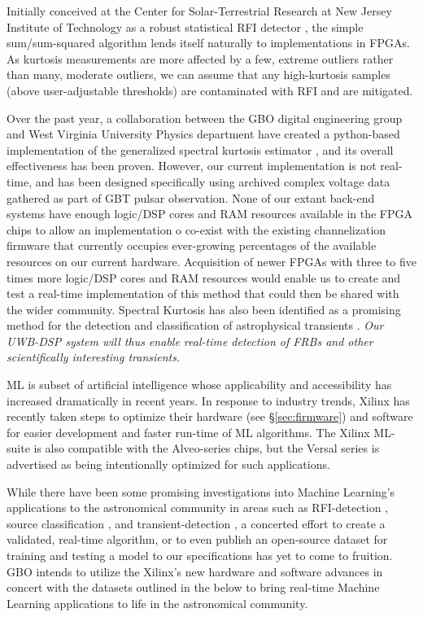 \documentclass[10pt]{myNSF}
\begin{document}
 Initially conceived at the Center for
Solar-Terrestrial Research at New Jersey Institute of Technology as a
robust statistical RFI detector \citep{ng10,nhmg16}, the simple
sum/sum-squared algorithm lends itself naturally to implementations in
FPGAs.  As kurtosis measurements are more affected by a few, extreme
outliers rather than many, moderate outliers, we can assume that any
high-kurtosis samples (above user-adjustable thresholds) are
contaminated with RFI and are mitigated.  

Over the past year, a collaboration between the GBO digital
engineering group and West Virginia University Physics department have
created a python-based implementation of the generalized spectral
kurtosis estimator \citep{ng10}, and its overall effectiveness has
been proven. However, our current implementation is not real-time, and
has been designed specifically using archived complex voltage data
gathered as part of GBT pulsar observation.  None of our extant
back-end systems have enough logic/DSP cores and RAM resources
available in the FPGA chips to allow an implementation o co-exist with
the existing channelization firmware that currently occupies
ever-growing percentages of the available resources on our current
hardware. Acquisition of newer FPGAs with three to five times more
logic/DSP cores and RAM resources would enable us to create and test a
real-time implementation of this method that could then be shared with
the wider community.  Spectral Kurtosis has also been identified as a
promising method for the detection and classification of astrophysical
transients \cite{nhmg16}.  \emph{Our UWB-DSP system will thus enable
  real-time detection of FRBs and other scientifically interesting
  transients.}

 ML is subset of artificial intelligence
whose applicability and accessibility has increased dramatically in
recent years. In response to industry trends, Xilinx has recently
taken steps to optimize their hardware (see \S\ref{sec:firmware}) and
software for easier development and faster run-time of ML algorithms.
The Xilinx ML-suite is also compatible with the Alveo-series chips,
but the Versal series is advertised as being intentionally optimized
for such applications.

While there have been some promising investigations into Machine
Learning’s applications to the astronomical community in areas such as
RFI-detection \citep{wol16}, source classification
\citep{zbm+14,at17}, and transient-detection \citep{zgf+18}, a
concerted effort to create a validated, real-time algorithm, or to
even publish an open-source dataset for training and testing a model
to our specifications has yet to come to fruition.  GBO intends to
utilize the Xilinx's new hardware and software advances in concert
with the datasets outlined in the below to bring real-time Machine
Learning applications to life in the astronomical community.
\end{document}

